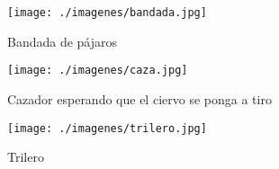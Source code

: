 \begin{figure}[h]
    \centering
    \begin{minipage}{.3\textwidth}
        \centering
        \texttt{[image: ./imagenes/bandada.jpg]}
        \caption{Bandada de pájaros}
    \end{minipage}
    \hfill
    \begin{minipage}{.3\textwidth}
        \centering
        \texttt{[image: ./imagenes/caza.jpg]}
        \caption{Cazador esperando que el ciervo se ponga a tiro}
    \end{minipage}
    \hfill
    \begin{minipage}{.3\textwidth}
        \centering
        \texttt{[image: ./imagenes/trilero.jpg]}
        \caption{Trilero}
    \end{minipage}
\end{figure}
